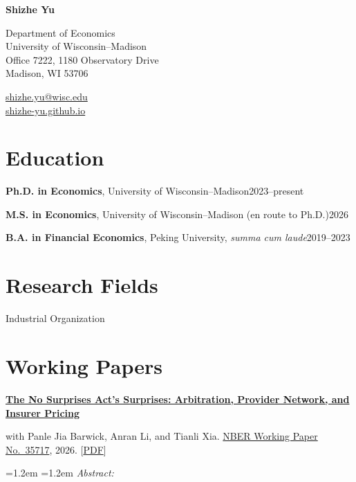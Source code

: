 \documentclass[11pt,letterpaper]{article}
\newcommand{\entry}[2]{\noindent #1\hfill #2\par\vspace{3pt}}
\newcommand{\paper}[3]{%
  \noindent\textbf{#1}\par
  \noindent #2\par
  \if\relax\detokenize{#3}\relax\else
    \vspace{3pt}
    {\leftskip=1.2em \rightskip=1.2em \small\noindent \textit{Abstract:} #3\par}
  \fi
  \vspace{9pt}}
\begin{document}
\thispagestyle{firstpage}

\begin{minipage}[t]{0.55\textwidth}
  {\LARGE\textbf{Shizhe Yu}}\par\vspace{4pt}
  Department of Economics\\
  University of Wisconsin--Madison\\
  Office 7222, 1180 Observatory Drive\\
  Madison, WI 53706
\end{minipage}%
\hfill
\begin{minipage}[t]{0.40\textwidth}
  \raggedleft
  \vspace{24pt}
  \href{mailto:shizhe.yu@wisc.edu}{shizhe.yu@wisc.edu}\\
  \href{https://shizhe-yu.github.io}{shizhe-yu.github.io}
\end{minipage}

\section{Education}

\entry{\textbf{Ph.D. in Economics}, University of Wisconsin--Madison}{2023--present}
\entry{\textbf{M.S. in Economics}, University of Wisconsin--Madison (en route to Ph.D.)}{2026}
\entry{\textbf{B.A. in Financial Economics}, Peking University, \textit{summa cum laude}}{2019--2023}

\section{Research Fields}

Industrial Organization

\section{Working Papers}

\paper{\href{https://www.nber.org/papers/w35717}{The No Surprises Act's Surprises: Arbitration, Provider Network, and Insurer Pricing}}
  {with Panle Jia Barwick, Anran Li, and Tianli Xia. \href{https://www.nber.org/papers/w35717}{NBER Working Paper No.~35717}, 2026. [\href{https://www.nber.org/papers/w35717.pdf}{PDF}]}
  {}
\end{document}
